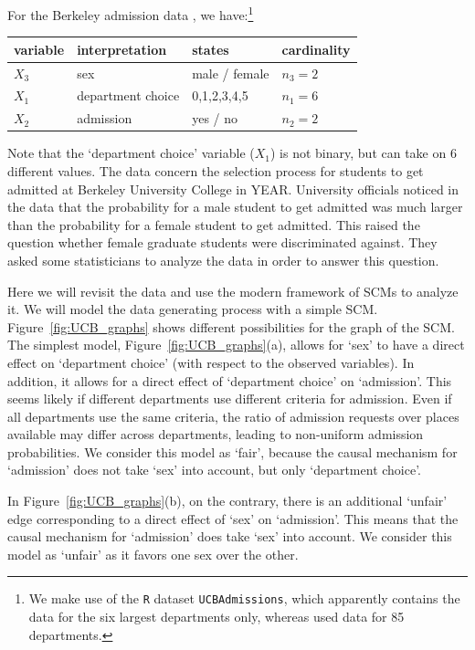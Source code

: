 \begin{Eg}
  For the Berkeley admission data \cite{BickelHammelOConnel1975}, we have:\footnote{We make use of the \texttt{R} dataset \texttt{UCBAdmissions}, which apparently contains the data for the six largest departments only, whereas \cite{BickelHammelOConnel1975} used data for 85 departments.}
  \begin{center}\begin{tabular}{llll}
    variable & interpretation    & states        & cardinality \\
    \hline
    $X_3$    & sex               & male / female & $n_3 = 2$   \\
    $X_1$    & department choice & 0,1,2,3,4,5   & $n_1 = 6$   \\
    $X_2$    & admission         & yes / no      & $n_2 = 2$
  \end{tabular}\end{center}
  Note that the `department choice' variable ($X_1$) is not binary, but can take on 6 different values.
  The data concern the selection process for students to get admitted at Berkeley University College in YEAR.
  University officials noticed in the data that the probability for a male student to get admitted was much larger than the probability for a female student to get admitted.
  This raised the question whether female graduate students were discriminated against.
  They asked some statisticians to analyze the data in order to answer this question.
  
  Here we will revisit the data and use the modern framework of SCMs to analyze it.
  We will model the data generating process with a simple SCM.
  Figure~\ref{fig:UCB_graphs} shows different possibilities for the graph of the SCM.
  The simplest model, Figure~\ref{fig:UCB_graphs}(a), allows for `sex' to have a direct effect on `department choice' (with respect to the observed variables).
  In addition, it allows for a direct effect of `department choice' on `admission'. 
  This seems likely if different departments use different criteria for admission.
  Even if all departments use the same criteria, the ratio of admission requests over places available may differ across departments, leading to non-uniform admission probabilities.
  We consider this model as `fair', because the causal mechanism for `admission' does not take `sex' into account, but only `department choice'.

  In Figure~\ref{fig:UCB_graphs}(b), on the contrary, there is an additional `unfair' edge corresponding to a direct effect of `sex' on `admission'.
  This means that the causal mechanism for `admission' does take `sex' into account.
  We consider this model as `unfair' as it favors one sex over the other.


\end{Eg}
